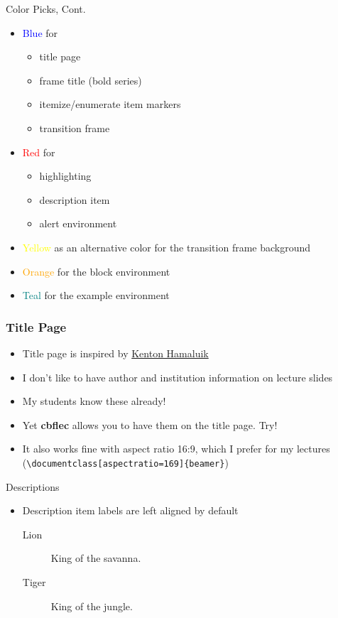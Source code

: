 \documentclass[11pt, aspectratio=43]{beamer}
\begin{document}
\begin{frame}{Color Picks, Cont.}
    \begin{itemize}
        \item \textcolor{blue}{Blue} for
        \begin{itemize}
            \item title page
            \item frame title (bold series)
            \item itemize/enumerate item markers
            \item transition frame
        \end{itemize}
        \item \textcolor{red}{Red} for
        \begin{itemize}
            \item highlighting 
            \item description item
            \item alert environment
        \end{itemize}
        \item \textcolor{yellow}{Yellow} as an alternative color for the transition frame background 
        \item \textcolor{orange}{Orange} for the block environment
        \item \textcolor{teal}{Teal} for the example environment
    \end{itemize}
\end{frame}

\begin{frame}[fragile]
    \frametitle{Title Page}
    \begin{itemize}
        \item Title page is inspired by \href{https://blog.hamaluik.ca/posts/better-beamer-themes/}{Kenton Hamaluik}
        \item I don't like to have author and institution information on lecture slides
        \item My students know these already!
        \item Yet \textbf{cbflec} allows you to have them on the title page. Try!
        \item It also works fine with aspect ratio 16:9, which I prefer for my lectures (\verb!\documentclass[aspectratio=169]{beamer}!)
    \end{itemize}
\end{frame}

\begin{frame}{Descriptions}
    \begin{itemize}
        \item Description item labels are left aligned by default
        \begin{description}
            \item[Lion] King of the savanna.
            \item[Tiger] King of the jungle.
        \end{description}
    \end{itemize}
\end{frame}
\end{document}
